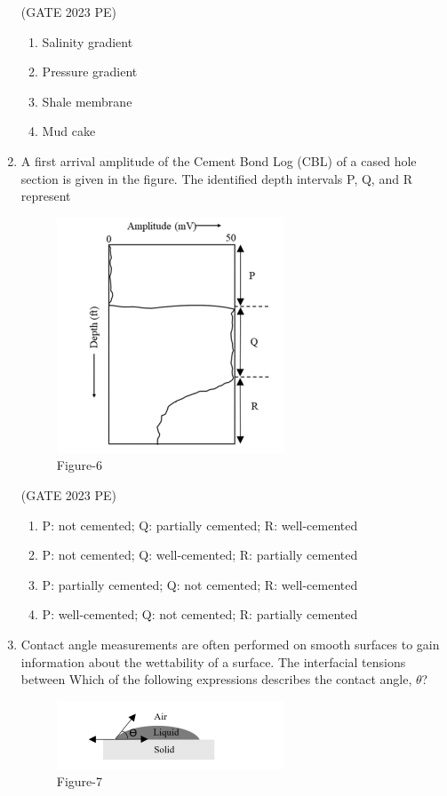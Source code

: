 \documentclass[journal,12pt,onecolumn]{exam}
\theoremstyle{remark}
\begin{document}
\begin{enumerate}
\hfill{(GATE 2023 PE)}\\
\begin{enumerate}
    \item Salinity gradient
    \item Pressure gradient
    \item Shale membrane
    \item Mud cake
\end{enumerate}
\item A first arrival amplitude of the Cement Bond Log (CBL) of a cased hole section is
given in the figure. The identified depth intervals P, Q, and R represent
\begin{figure}[H]
    \centering
    \includegraphics[width=0.5\linewidth]{figs/fig6.png}
    \caption{Figure-6}
    \label{fig:figs/fig6.png}
\end{figure}

    \hfill{(GATE 2023 PE)}\\
\begin{enumerate}
    \item P: not cemented; Q: partially cemented; R: well-cemented
    \item P: not cemented; Q: well-cemented; R: partially cemented
    \item P: partially cemented; Q: not cemented; R: well-cemented
    \item P: well-cemented; Q: not cemented; R: partially cemented
\end{enumerate}
\item Contact angle measurements are often performed on smooth surfaces to gain
information about the wettability of a surface. The interfacial tensions between
Which of the following expressions describes the contact angle, $\theta$?

\begin{figure}[H]
    \centering
    \includegraphics[width=0.5\linewidth]{figs/fig7.png}
    \caption{Figure-7}
    \label{fig:figs/fig7.png}
\end{figure}


\end{enumerate}
\end{document}
